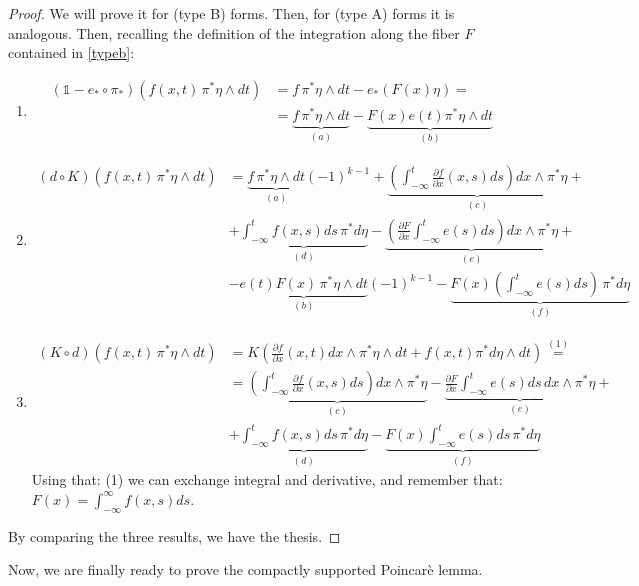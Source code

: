 \documentclass[a4paper,11pt,titlepage, article, oneside]{memoir}
\numberwithin{equation}{section}
\theoremstyle{definition}
\theoremstyle{remark}
\newcommand{\defonde}[2]{\frac{\partial {#1}}{\partial {#2}}}
\begin{document}
\begin{proof}
We will prove it for (type B) forms. Then, for (type A) forms it is analogous. Then, recalling the definition of the integration along the fiber $F$ contained in \eqref{typeb}:
\begin{enumerate}
\item
\begin{align*}
(\mathbb{1} - e_* \circ \pi_*)(f(x, t) \, \pi^* \eta \wedge dt ) &=f\, \pi^*\eta \wedge dt - e_*(F(x) \eta) = \\
&= \underbrace{f\, \pi^* \eta \wedge dt}_{(a)} - \underbrace{F(x) e(t) \pi^* \eta \wedge dt}_{(b)}
\end{align*}
\item 
\begin{align*}
(d \circ K)(f(x, t) \, \pi^* \eta \wedge dt) &= \underbrace{f\, \pi^* \eta \wedge dt}_{(a)}(-1)^{k-1} + \underbrace{\left( \int_{-\infty}^t \defonde{f}{x}(x, s) ds \right) dx \wedge \pi^* \eta}_{(c)} + \\
&+ \underbrace{\int_{-\infty}^t f(x, s) ds \, \pi^* d\eta}_{(d)} - \underbrace{\left( \defonde{F}{x}\int_{-\infty}^t e(s) ds \right) dx \wedge \pi^* \eta}_{(e)} + \\
&- \underbrace{e(t)F(x) \, \pi^*\eta \wedge dt}_{(b)} (-1)^{k-1} - \underbrace{F(x)\left(\int_{-\infty}^t e(s) ds \right)\, \pi^* d\eta}_{(f)}
\end{align*}
\item 
\begin{align*}
(K \circ d) (f(x, t) \, \pi^* \eta \wedge dt) &= K \left( \defonde{f}{x}(x, t) dx \wedge \pi^*\eta \wedge dt + f(x, t) \pi^* d\eta \wedge dt\right) \overset{(1)}{=} \\
&= \underbrace{\left(\int_{-\infty}^t \defonde{f}{x}(x, s) ds \right) dx \wedge \pi^*\eta}_{(c)} - \underbrace{\defonde{F}{x} \int_{-\infty}^t e(s)ds \,dx \wedge \pi^* \eta}_{(e)} + \\
&+ \underbrace{\int_{-\infty}^t f(x, s) ds \, \pi^* d\eta}_{(d)} - \underbrace{F(x) \int_{-\infty}^t e(s) ds \, \pi^* d\eta}_{(f)}
\end{align*}
Using that: (1) we can exchange integral and derivative, and remember that: $F(x) = \int_{-\infty}^{\infty} f(x, s) ds$.
\end{enumerate}
By comparing the three results, we have the thesis.
\end{proof}

Now, we are finally ready to prove the compactly supported Poincarè lemma.
\end{document}
